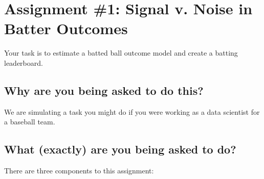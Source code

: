 \documentclass{article}
\begin{document}
  \section*{\sc Assignment \#1: Signal v. Noise in Batter Outcomes}

    Your task is to estimate a batted ball outcome model and create a batting leaderboard.

    \subsection*{\sc Why are you being asked to do this?}

      We are simulating a task you might do if you were working as a data scientist for a baseball team.

    \subsection*{\sc What (exactly) are you being asked to do?}

      There are three components to this assignment:
\end{document}
